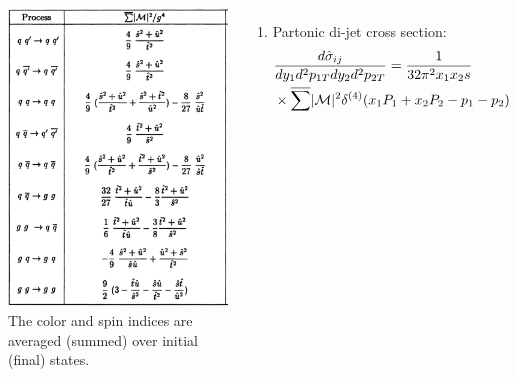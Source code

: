 \documentclass[9pt,a4paper,unknownkeysallowed,xcolor=dvipsnames,aspectratio=43]{beamer}
\begin{document}
\begin{frame}
\vspace{2mm}
\begin{columns}
\begin{center}
    \includegraphics[width=\textwidth]{02/2to2.png}\\
    \vspace{1mm}
    {\tiny The color and spin indices are averaged (summed) over initial (final) states.}
\end{center}
\begin{enumerate}
    \item<1-> Partonic di-jet cross section:
    \begin{align}
        &\frac{d\hat{\sigma}_{ij}}{dy_1 d^2p_{1T} dy_2 d^2p_{2T}}=\frac{1}{32\pi^2 x_1 x_2 s}\\
        &\times \overline{\sum} |\mathcal{M}|^2\delta^{(4)}(x_1P_1+x_2 P_2 - p_1 -p_2)\notag

\end{align}
\end{enumerate}
\end{columns}
\end{frame}
\end{document}
